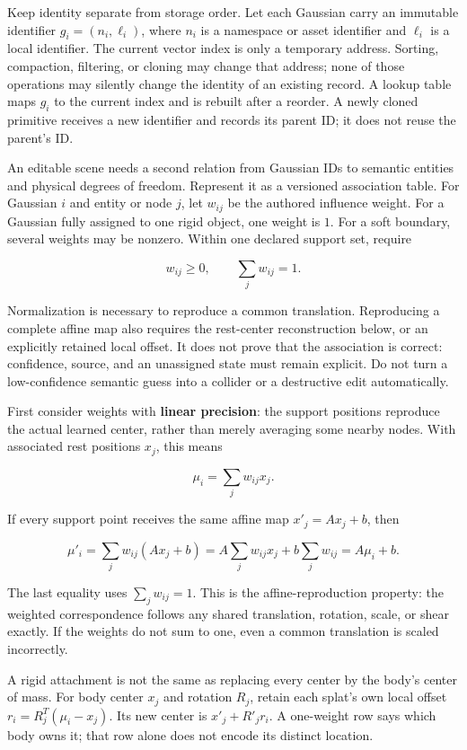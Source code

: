 Keep identity separate from storage order. Let each Gaussian carry an immutable identifier \(g_i=(n_i,\ell_i)\), where \(n_i\) is a namespace or asset identifier and \(\ell_i\) is a local identifier. The current vector index is only a temporary address. Sorting, compaction, filtering, or cloning may change that address; none of those operations may silently change the identity of an existing record. A lookup table maps \(g_i\) to the current index and is rebuilt after a reorder. A newly cloned primitive receives a new identifier and records its parent ID; it does not reuse the parent's ID.

An editable scene needs a second relation from Gaussian IDs to semantic entities and physical degrees of freedom. Represent it as a versioned association table. For Gaussian \(i\) and entity or node \(j\), let \(w_{ij}\) be the authored influence weight. For a Gaussian fully assigned to one rigid object, one weight is \(1\). For a soft boundary, several weights may be nonzero. Within one declared support set, require

\[
w_{ij}\ge 0,\qquad \sum_j w_{ij}=1.
\]

Normalization is necessary to reproduce a common translation. Reproducing a complete affine map also requires the rest-center reconstruction below, or an explicitly retained local offset. It does not prove that the association is correct: confidence, source, and an unassigned state must remain explicit. Do not turn a low-confidence semantic guess into a collider or a destructive edit automatically.

First consider weights with \textbf{linear precision}: the support positions reproduce the actual learned center, rather than merely averaging some nearby nodes. With associated rest positions \(x_j\), this means

\[
\mu_i=\sum_jw_{ij}x_j.
\]

If every support point receives the same affine map \(x'_j=Ax_j+b\), then

\[
\mu'_i=\sum_jw_{ij}(Ax_j+b)
=A\sum_jw_{ij}x_j+b\sum_jw_{ij}
=A\mu_i+b.
\]

The last equality uses \(\sum_jw_{ij}=1\). This is the affine-reproduction property: the weighted correspondence follows any shared translation, rotation, scale, or shear exactly. If the weights do not sum to one, even a common translation is scaled incorrectly.

A rigid attachment is not the same as replacing every center by the body's center of mass. For body center \(x_j\) and rotation \(R_j\), retain each splat's own local offset \(r_i=R_j^T(\mu_i-x_j)\). Its new center is \(x'_j+R'_jr_i\). A one-weight row says which body owns it; that row alone does not encode its distinct location.

